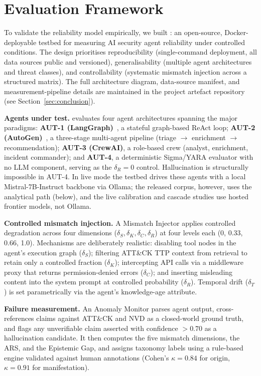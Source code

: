 \section{\ARESBench{} Evaluation Framework}
\label{sec:aresbench}

To validate the reliability model empirically, we built
\ARESBench{}: an open-source, Docker-deployable testbed for measuring
AI security agent reliability under controlled conditions. The design
prioritises reproducibility (single-command deployment, all data
sources public and versioned), generalisability (multiple agent
architectures and threat classes), and controllability (systematic
mismatch injection across a structured matrix). The full architecture
diagram, data-source manifest, and measurement-pipeline details are
maintained in the project artefact repository (see Section~\ref{sec:conclusion}).

\textbf{Agents under test.} \ARESBench{} evaluates four agent
architectures spanning the major paradigms: \textbf{AUT-1
(LangGraph)}~\cite{langgraph2024}, a stateful graph-based ReAct loop;
\textbf{AUT-2 (AutoGen)}~\cite{wu2023autogen}, a three-stage
multi-agent pipeline (triage $\to$ enrichment $\to$ recommendation);
\textbf{AUT-3 (CrewAI)}, a role-based crew (analyst, enrichment,
incident commander); and \textbf{AUT-4}, a deterministic Sigma/YARA
evaluator with no LLM component, serving as the $\delta_R = 0$
control. Hallucination is structurally impossible in AUT-4. In live mode the
testbed drives these agents with a local Mistral-7B-Instruct backbone
via Ollama; the released \SAFK{} corpus, however, uses the analytical
path (below), and the live calibration and cascade studies use hosted
frontier models, not Ollama.

\textbf{Controlled mismatch injection.} A Mismatch Injector applies
controlled degradation across four dimensions ($\delta_S, \delta_K,
\delta_C, \delta_R$) at four levels each (0, 0.33, 0.66, 1.0).
Mechanisms are deliberately realistic: disabling tool nodes in the
agent's execution graph ($\delta_S$); filtering ATT\&CK TTP context
from retrieval to retain only a controlled fraction ($\delta_K$);
intercepting API calls via a middleware proxy that returns
permission-denied errors ($\delta_C$); and inserting misleading content
into the system prompt at controlled probability ($\delta_R$).
Temporal drift ($\delta_T$) is set parametrically via the agent's
knowledge-age attribute.

\textbf{Failure measurement.} An Anomaly Monitor parses agent
output, cross-references claims against ATT\&CK and NVD as a
closed-world ground truth, and flags any unverifiable claim asserted
with confidence $> 0.70$ as a hallucination candidate. It then
computes the five mismatch dimensions, the ARS, and the Epistemic Gap,
and assigns taxonomy labels using a rule-based engine validated
against human annotations (Cohen's $\kappa = 0.84$ for origin,
$\kappa = 0.91$ for manifestation).

